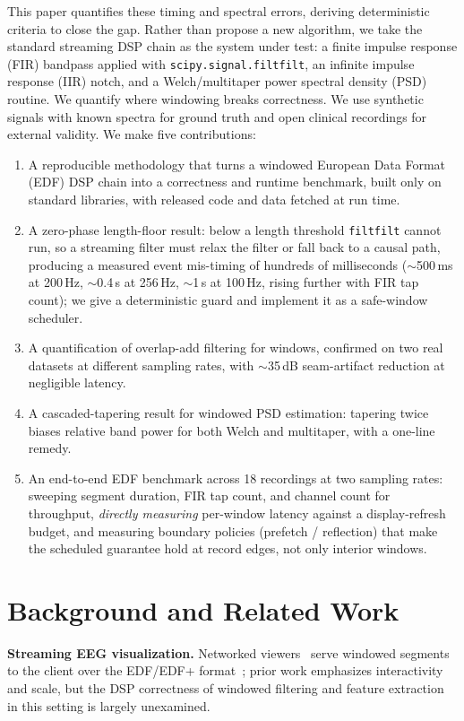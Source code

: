 \documentclass[conference]{IEEEtranSPMB}
\begin{document}
This paper quantifies these timing and spectral errors, deriving deterministic criteria to close the gap. Rather than
propose a new algorithm, we take the standard streaming DSP chain as the system under test: a
finite impulse response (FIR) bandpass applied with \texttt{scipy.signal.filtfilt}, an infinite
impulse response (IIR) notch, and a Welch/multitaper power spectral density (PSD) routine. We
quantify where windowing breaks correctness. We use
synthetic signals with known spectra for ground truth and open clinical recordings for external
validity. We make five contributions:
\begin{enumerate}
\item A reproducible methodology that turns a windowed European Data Format (EDF) DSP chain into a correctness and
runtime benchmark, built only on standard libraries, with released code and data fetched at run
time.
\item A zero-phase length-floor result: below a length threshold \texttt{filtfilt} cannot run, so
a streaming filter must relax the filter or fall back to a causal path, producing a measured
event mis-timing of hundreds of milliseconds ($\sim$500\,ms at 200\,Hz, $\sim$0.4\,s at 256\,Hz,
$\sim$1\,s at 100\,Hz, rising further with FIR tap count); we give a deterministic guard and implement it as a
safe-window scheduler.
\item A quantification of overlap-add filtering for windows, confirmed on two real datasets at
different sampling rates, with $\sim$35\,dB seam-artifact reduction at negligible latency.
\item A cascaded-tapering result for windowed PSD estimation: tapering twice biases relative band
power for both Welch and multitaper, with a one-line remedy.
\item An end-to-end EDF benchmark across 18 recordings at two sampling rates: sweeping segment
duration, FIR tap count, and channel count for throughput, \emph{directly measuring} per-window
latency against a display-refresh budget, and measuring boundary policies (prefetch /
reflection) that make the scheduled guarantee hold at record edges, not only interior windows.
\end{enumerate}

\section{Background and Related Work}
\textbf{Streaming EEG visualization.} Networked viewers~\cite{weiler2023robin,currey2023epviz}
serve windowed segments to the client over the EDF/EDF+ format~\cite{kemp1992,kemp2003}; prior work
emphasizes interactivity and scale, but
the DSP correctness of windowed filtering and feature extraction in this setting is largely
unexamined.
\end{document}

